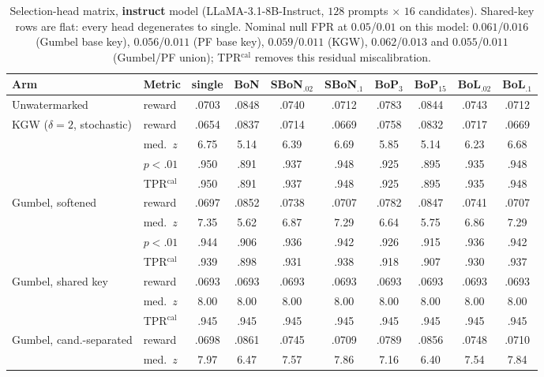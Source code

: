 \documentclass{article} %
\begin{document}
\begin{table}[h]
\caption{Selection-head matrix, \textbf{instruct} model
(LLaMA-3.1-8B-Instruct, $128$ prompts $\times$ $16$ candidates). Shared-key
rows are flat: every head degenerates to single. Nominal null FPR at
$0.05$/$0.01$ on this model: $0.061$/$0.016$ (Gumbel base key),
$0.056$/$0.011$ (PF base key), $0.059$/$0.011$ (KGW), $0.062$/$0.013$ and
$0.055$/$0.011$ (Gumbel/PF union); TPR$^{\mathrm{cal}}$ removes this
residual miscalibration.}
\label{tab:matrix_instr}
\begin{center}
\scriptsize
\setlength{\tabcolsep}{3.2pt}
\begin{tabular}{llcccccccc}
\toprule
Arm & Metric & single & BoN & SBoN$_{.02}$ & SBoN$_{.1}$ & BoP$_{3}$ & BoP$_{15}$ & BoL$_{.02}$ & BoL$_{.1}$ \\
\midrule
Unwatermarked & reward & .0703 & .0848 & .0740 & .0712 & .0783 & .0844 & .0743 & .0712 \\
\midrule
KGW ($\delta{=}2$, stochastic) & reward & .0654 & .0837 & .0714 & .0669 & .0758 & .0832 & .0717 & .0669 \\
 & med.\ $z$ & 6.75 & 5.14 & 6.39 & 6.69 & 5.85 & 5.14 & 6.23 & 6.68 \\
 & $p{<}.01$ & .950 & .891 & .937 & .948 & .925 & .895 & .935 & .948 \\
 & TPR$^{\mathrm{cal}}$ & .950 & .891 & .937 & .948 & .925 & .895 & .935 & .948 \\
\midrule
Gumbel, softened & reward & .0697 & .0852 & .0738 & .0707 & .0782 & .0847 & .0741 & .0707 \\
 & med.\ $z$ & 7.35 & 5.62 & 6.87 & 7.29 & 6.64 & 5.75 & 6.86 & 7.29 \\
 & $p{<}.01$ & .944 & .906 & .936 & .942 & .926 & .915 & .936 & .942 \\
 & TPR$^{\mathrm{cal}}$ & .939 & .898 & .931 & .938 & .918 & .907 & .930 & .937 \\
\midrule
Gumbel, shared key & reward & .0693 & .0693 & .0693 & .0693 & .0693 & .0693 & .0693 & .0693 \\
 & med.\ $z$ & 8.00 & 8.00 & 8.00 & 8.00 & 8.00 & 8.00 & 8.00 & 8.00 \\
 & TPR$^{\mathrm{cal}}$ & .945 & .945 & .945 & .945 & .945 & .945 & .945 & .945 \\
\midrule
Gumbel, cand.-separated & reward & .0698 & .0861 & .0745 & .0709 & .0789 & .0856 & .0748 & .0710 \\
 & med.\ $z$ & 7.97 & 6.47 & 7.57 & 7.86 & 7.16 & 6.40 & 7.54 & 7.84 \\

\end{tabular}
\end{center}
\end{table}
\end{document}
